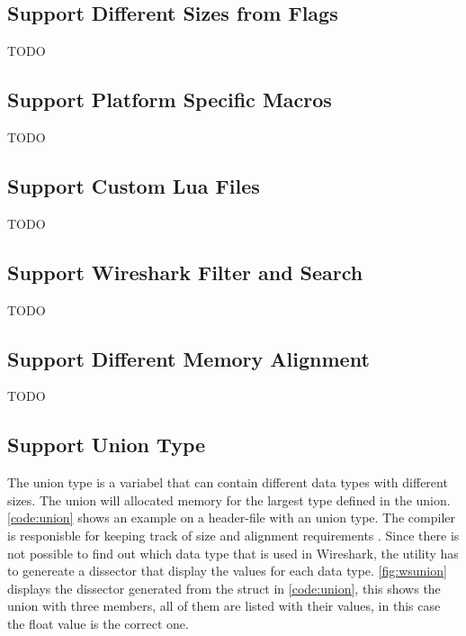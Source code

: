 \subsection{Support Different Sizes from Flags}
TODO

\subsection{Support Platform Specific Macros}
TODO

\subsection{Support Custom Lua Files}
TODO

\subsection{Support Wireshark Filter and Search}
TODO

\subsection{Support Different Memory Alignment}
TODO

\subsection{Support Union Type}
The union type is a variabel that can contain different data types with 
different sizes. The union will allocated memory for the largest type defined 
in the union. \autoref{code:union} shows an example on a header-file with an 
union type. The compiler is responisble for keeping track of size and 
alignment requirements\cite[p.147]{Kerninghan1988} . Since there is not 
possible to find out which data type that is used in Wireshark, the utility 
has to genereate a dissector that display the values for each data type. 
\autoref{fig:wsunion} displays the dissector generated from the struct in 
\autoref{code:union}, this shows the union with three members, all of them are 
listed with their values, in this case the float value is the correct one.

